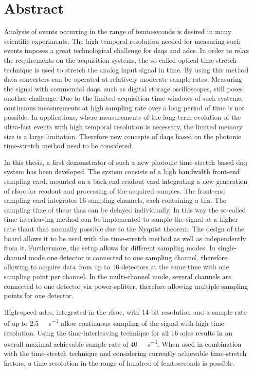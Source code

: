 \chapter*{Abstract}

Analysis of events occurring in the range of femtoseconds is desired in many scientific experiments.
The high temporal resolution needed for measuring such events imposes a great technological challenge for \glspl{daq} and \glspl{adc}.
In order to relax the requirements on the acquisition systems, the so-called optical time-stretch technique is used to stretch the analog input signal in time.
By using this method data converters can be operated at relatively moderate sample rates. %
Measuring the signal with commercial \glspl{daq}, such as digital storage oscilloscopes, still poses another challenge.
Due to the limited acquisition time windows of such systems, continuous measurements at high sampling rate over a long period of time is not possible.
In applications, where measurements of the long-term evolution of the ultra-fast events with high temporal resolution is necessary, the limited memory size is a large limitation.
Therefore new concepts of \glspl{daq} based on the photonic time-stretch method need to be considered.

In this thesis, a first demonstrator of such a new photonic time-stretch based \gls{daq} system has been developed.
The system consists of a high bandwidth front-end sampling card, mounted on a back-end readout card integrating a new generation of \gls{rfsoc} for readout and processing of the acquired samples. 
The front-end sampling card integrates 16 sampling channels, each containing a \gls{tha}. 
The sampling time of these \glspl{tha} can be delayed individually.
In this way the so-called time-interleaving method can be implemented to sample the signal at a higher rate thant that normally possible due to the Nyquist theorem.
The design of the board allows it to be used with the time-stretch method as well as independently from it.
Furthermore, the setup allows for different sampling modes.
In single-channel mode one detector is connected to one sampling channel, therefore allowing to acquire data from up to 16 detectors at the same time with one sampling point per channel.
In the multi-channel mode, several channels are connected to one detector via power-splitter, therefore allowing multiple sampling points for one detector. %

High-speed \glspl{adc}, integrated in the \gls{rfsoc}, with 14-bit resolution and a sample rate of up to \SI{2.5}{\giga \sample \per \second} allow continuous sampling of the signal with high time resolution. 
Using the time-interleaving technique for all 16 \glspl{adc} results in an overall maximal achievable sample rate of \SI{40}{\giga \sample \per \second}.  %
When used in combination with the time-stretch technique and considering currently achievable time-stretch factors, a time resolution in the range of hundred of femtoseconds is possible. %

